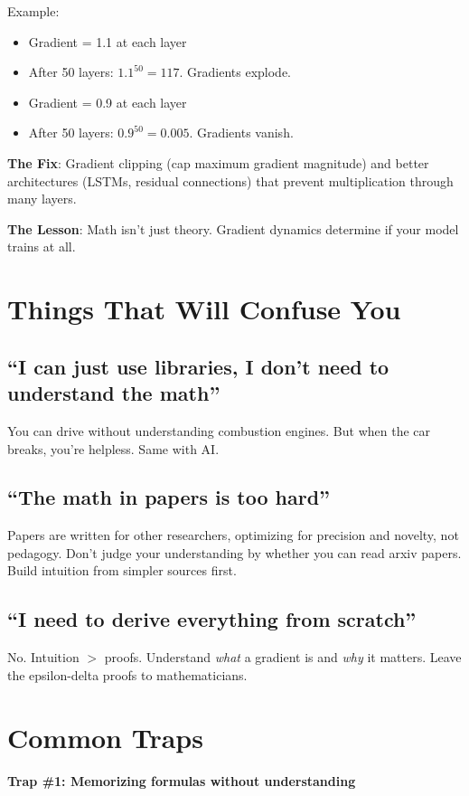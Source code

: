 \documentclass[11pt,oneside]{book}
\begin{document}
Example:
\begin{itemize}
\item Gradient = 1.1 at each layer
\item After 50 layers: $1.1^{50} = 117$. Gradients explode.
\item Gradient = 0.9 at each layer
\item After 50 layers: $0.9^{50} = 0.005$. Gradients vanish.
\end{itemize}

\textbf{The Fix}: Gradient clipping (cap maximum gradient magnitude) and better architectures (LSTMs, residual connections) that prevent multiplication through many layers.

\textbf{The Lesson}: Math isn't just theory. Gradient dynamics determine if your model trains at all.

\section{Things That Will Confuse You}

\subsection{``I can just use libraries, I don't need to understand the math''}
You can drive without understanding combustion engines. But when the car breaks, you're helpless. Same with AI.

\subsection{``The math in papers is too hard''}
Papers are written for other researchers, optimizing for precision and novelty, not pedagogy. Don't judge your understanding by whether you can read arxiv papers. Build intuition from simpler sources first.

\subsection{``I need to derive everything from scratch''}
No. Intuition $>$ proofs. Understand \textit{what} a gradient is and \textit{why} it matters. Leave the epsilon-delta proofs to mathematicians.

\section{Common Traps}

\textbf{Trap \#1: Memorizing formulas without understanding}
\end{document}
